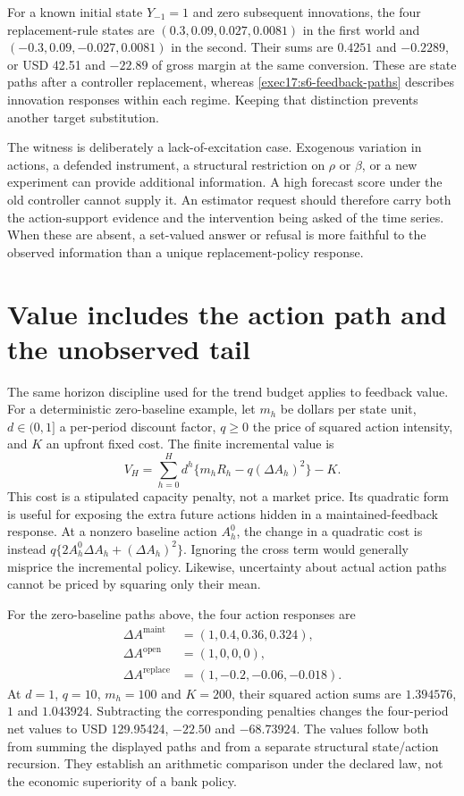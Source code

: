 For a known initial state $Y_{-1}=1$ and zero subsequent innovations, the
four replacement-rule states are $(0.3,0.09,0.027,0.0081)$ in the first
world and $(-0.3,0.09,-0.027,0.0081)$ in the second. Their sums are
$0.4251$ and $-0.2289$, or USD 42.51 and $-22.89$ of gross margin at
the same conversion. These are state paths after a controller replacement,
whereas \eqref{exec17:s6-feedback-paths} describes innovation responses
within each regime. Keeping that distinction prevents another target
substitution.

The witness is deliberately a lack-of-excitation case. Exogenous variation
in actions, a defended instrument, a structural restriction on $\rho$ or
$\beta$, or a new experiment can provide additional information. A high
forecast score under the old controller cannot supply it. An estimator
request should therefore carry both the action-support evidence and the
intervention being asked of the time series. When these are absent, a
set-valued answer or refusal is more faithful to the observed information
than a unique replacement-policy response.

\section{Value includes the action path and the unobserved tail}
\label{exec17:s6-value}

The same horizon discipline used for the trend budget applies to feedback
value. For a deterministic zero-baseline example, let $m_h$ be dollars per
state unit, $d\in(0,1]$ a per-period discount factor, $q\geq0$ the price
of squared action intensity, and $K$ an upfront fixed cost. The finite
incremental value is
\begin{equation}
 V_H=\sum_{h=0}^{H}d^h\{m_hR_h-q(\Delta A_h)^2\}-K.
 \label{exec17:s6-finite-value}
\end{equation}
This cost is a stipulated capacity penalty, not a market price. Its
quadratic form is useful for exposing the extra future actions hidden in
a maintained-feedback response. At a nonzero baseline action $A_h^0$,
the change in a quadratic cost is instead
$q\{2A_h^0\Delta A_h+(\Delta A_h)^2\}$. Ignoring the cross term
would generally misprice the incremental policy. Likewise, uncertainty
about actual action paths cannot be priced by squaring only their mean.

For the zero-baseline paths above, the four action responses are
\begin{align}
 \Delta A^{\mathrm{maint}}&=(1,0.4,0.36,0.324),\nonumber\\
 \Delta A^{\mathrm{open}}&=(1,0,0,0),\nonumber\\
 \Delta A^{\mathrm{replace}}&=(1,-0.2,-0.06,-0.018).
 \label{exec17:s6-action-paths}
\end{align}
At $d=1$, $q=10$, $m_h=100$ and $K=200$, their squared action sums
are $1.394576$, $1$ and $1.043924$. Subtracting the corresponding
penalties changes the four-period net values to USD 129.95424,
$-22.50$ and $-68.73924$. The values follow both from summing the
displayed paths and from a separate structural state/action recursion.
They establish an arithmetic comparison under the declared law, not the
economic superiority of a bank policy.~\citep{exec17_s6_math}

